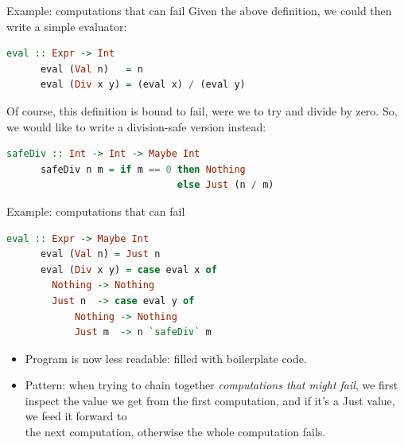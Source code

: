 \documentclass{beamer}
\begin{document}
\begin{frame}[fragile]{Example: computations that can fail}
    Given the above definition, we could then write a simple evaluator:

    \begin{minipage}{\linewidth} \hspace{1cm}
    \begin{lstlisting}[language=haskell, numbers=none, frame=none]
      eval :: Expr -> Int
      eval (Val n)   = n
      eval (Div x y) = (eval x) / (eval y)
    \end{lstlisting}
    \end{minipage} \hspace{1cm}

    Of course, this definition is bound to fail, were we to try and
    divide by zero. So, we would like to write a division-safe version
    instead:

    \begin{minipage}{\linewidth} \hspace{1cm}
    \begin{lstlisting}[language=haskell, numbers=none, frame=none]
      safeDiv :: Int -> Int -> Maybe Int
      safeDiv n m = if m == 0 then Nothing
                              else Just (n / m)
    \end{lstlisting}
    \end{minipage} \hspace{1cm}
\end{frame}

\begin{frame}[fragile]{Example: computations that can fail}
    \begin{minipage}{\linewidth} \hspace{1cm}
    \begin{lstlisting}[language=haskell, numbers=none, frame=none]
      eval :: Expr -> Maybe Int
      eval (Val n) = Just n
      eval (Div x y) = case eval x of
        Nothing -> Nothing
        Just n  -> case eval y of
            Nothing -> Nothing
            Just m  -> n `safeDiv` m
    \end{lstlisting}
    \end{minipage} \hspace{1cm}

    \begin{itemize}
        \item Program is now less readable: filled with boilerplate code.
        \item Pattern: when trying to chain together \textit{computations
        that might fail}, we first inspect the value we get from the first
        computation, and if it's a Just value, we feed it forward to\\
        the next computation, otherwise the whole computation fails.
    \end{itemize}
\end{frame}
\end{document}
